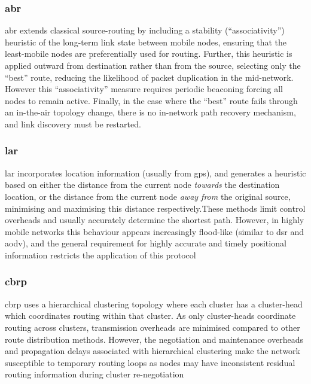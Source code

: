 \subsubsection{\gls{abr}}
\gls{abr} extends classical source-routing by including a stability (``associativity'') heuristic of the long-term link state between mobile nodes, ensuring that the least-mobile nodes are preferentially used for routing. Further, this heuristic is applied outward from destination rather than from the source, selecting only the ``best'' route, reducing the likelihood of packet duplication in the mid-network. However this ``associativity'' measure requires periodic beaconing forcing all nodes to remain active. Finally, in the case where the ``best'' route fails through an in-the-air topology change, there is no in-network path recovery mechanism, and link discovery must be restarted\cite{Toh1997}.\\
\subsubsection{\gls{lar}}
\gls{lar} incorporates location information (usually from \gls{gps}), and generates a heuristic based on either the distance from the current node \emph{towards} the destination location, or the distance from the current node \emph{away from} the original source, minimising and maximising this distance respectively.These methods limit control overheads and usually accurately determine the shortest path. However, in highly mobile networks this behaviour appears increasingly flood-like (similar to \gls{dsr} and \gls{aodv}), and the general requirement for highly accurate and timely positional information restricts the application of this protocol\\
\subsubsection{\gls{cbrp}}
\gls{cbrp} uses a hierarchical clustering topology where each cluster has a cluster-head which coordinates routing within that cluster. As only cluster-heads coordinate routing across clusters, transmission overheads are minimised compared to other route distribution methods. However, the negotiation and maintenance overheads and propagation delays associated with hierarchical clustering make the network susceptible to temporary routing loops as nodes may have inconsistent residual routing information during cluster re-negotiation\\

